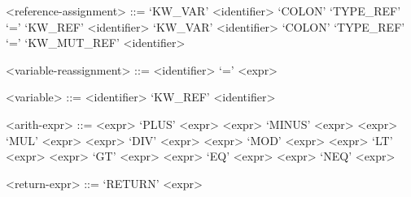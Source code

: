\begin{grammar}
<reference-assignment> ::= `KW_VAR' <identifier> `COLON' `TYPE_REF' `=' `KW_REF' <identifier>
\alt `KW_VAR' <identifier> `COLON' `TYPE_REF' `=' `KW_MUT_REF' <identifier>

<variable-reassignment> ::= <identifier> `=' <expr>

<variable> ::= <identifier>
\alt `KW_REF' <identifier>

<arith-expr> ::= <expr> `PLUS' <expr>
\alt <expr> `MINUS' <expr>
\alt <expr> `MUL' <expr>
\alt <expr> `DIV' <expr>
\alt <expr> `MOD' <expr>
\alt <expr> `LT' <expr>
\alt <expr> `GT' <expr>
\alt <expr> `EQ' <expr>
\alt <expr> `NEQ' <expr>

<return-expr> ::= `RETURN' <expr>
\end{grammar}

